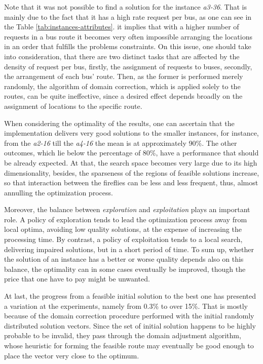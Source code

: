 \documentclass[tuberlin,cic,tc,openright,english,noabntcite,oneside]{iiufrgs}
\begin{document}
Note that it was not possible to find a solution for the instance \emph{a3-36}. That is mainly due to the fact that it has a high rate request per bus, as one can see in the Table \ref{tab:instances-attributes}. it implies that with a higher number of requests in a bus route it becomes very often impossible arranging the locations in an order that fulfills the problems constraints. On this issue, one should take into consideration, that there are two distinct tasks that are affected by the density of request per bus, firstly, the assignment of requests to buses, secondly, the arrangement of each bus' route. Then, as the former is performed merely randomly, the algorithm of domain correction, which is applied solely to the routes, can be quite ineffective, since a desired effect depends broadly on the assignment of locations to the specific route.

When considering the optimality of the results, one can ascertain that the implementation delivers very good solutions to the smaller instances, for instance, from the \emph{a2-16} till the \emph{a4-16} the mean is at approximately 90\%. The other outcomes, which lie below the percentage of 80\%, have a performance that should be already expected. At that, the search space becomes very large due to its high dimensionality, besides, the sparseness of the regions of feasible solutions increase, so that interaction between the fireflies can be less and less frequent, thus, almost annulling the optimization process.

Moreover, the balance between \emph{exploration} and \emph{exploitation} plays an important role. A policy of exploration tends to lead the optimization process away from local optima, avoiding low quality solutions, at the expense of increasing the processing time. By contrast, a policy of exploitation tends to a local search, delivering impaired solutions, but in a short period of time. To sum up, whether the solution of an instance has a better or worse quality depends also on this balance, the optimality can in some cases eventually be improved, though the price that one have to pay might be unwanted.

At last, the progress from a feasible initial solution to the best one has presented a variation at the experiments, namely from 0.3\% to over 15\%. That is mostly because of the domain correction procedure performed with the initial randomly distributed solution vectors. Since the set of initial solution happens to be highly probable to be invalid, they pass through the domain adjustment algorithm, whose heuristic for forming the feasible route may eventually be good enough to place the vector very close to the optimum.
\end{document}
